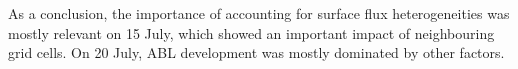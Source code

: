 As a conclusion, the importance of accounting for surface flux heterogeneities was mostly relevant on 15 July, which showed an important impact of neighbouring grid cells. On 20 July, ABL development was mostly dominated by other factors.

\hfill




\clearpage


